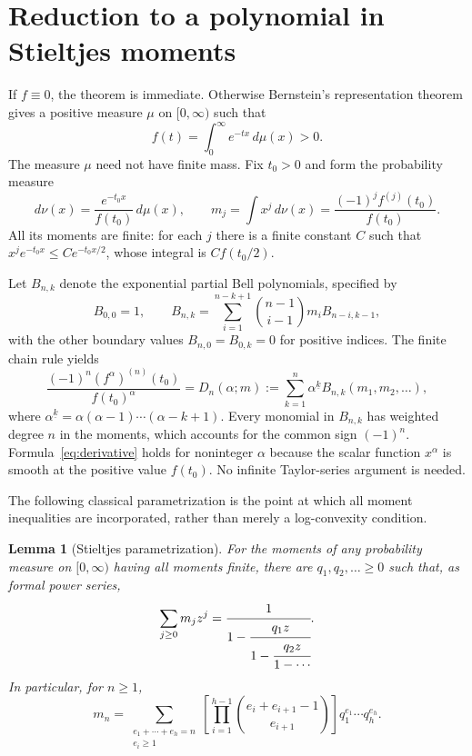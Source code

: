 \documentclass[11pt]{article}
\newtheorem{lemma}[theorem]{Lemma}
\newcommand{\fall}[2]{#1^{\underline{#2}}}
\begin{document}
\section{Reduction to a polynomial in Stieltjes moments}

If $f\equiv0$, the theorem is immediate. Otherwise Bernstein's representation
theorem \cite[Theorem~1.4]{Bernstein} gives a positive measure $\mu$ on $[0,\infty)$ such that
\[
f(t)=\int_0^\infty e^{-tx}\,d\mu(x)>0.
\]
The measure $\mu$ need not have finite mass. Fix $t_0>0$ and form the probability
measure
\[
d\nu(x)=\frac{e^{-t_0x}}{f(t_0)}\,d\mu(x),\qquad
m_j=\int x^j\,d\nu(x)=\frac{(-1)^jf^{(j)}(t_0)}{f(t_0)}.
\]
All its moments are finite: for each $j$ there is a finite constant $C$ such
that $x^je^{-t_0x}\le C e^{-t_0x/2}$, whose integral is $Cf(t_0/2)$.

Let $B_{n,k}$ denote the exponential partial Bell polynomials, specified by
\begin{equation}\label{eq:Bell}
B_{0,0}=1,\qquad
B_{n,k}=\sum_{i=1}^{n-k+1}\binom{n-1}{i-1}m_iB_{n-i,k-1},
\end{equation}
with the other boundary values $B_{n,0}=B_{0,k}=0$ for positive indices.
The finite chain rule yields
\begin{equation}\label{eq:derivative}
\frac{(-1)^n(f^\alpha)^{(n)}(t_0)}{f(t_0)^\alpha}
=D_n(\alpha;m):=\sum_{k=1}^n\fall{\alpha}{k}B_{n,k}(m_1,m_2,\ldots),
\end{equation}
where $\fall{\alpha}{k}=\alpha(\alpha-1)\cdots(\alpha-k+1)$.
Every monomial in $B_{n,k}$ has weighted degree $n$ in the moments, which
accounts for the common sign $(-1)^n$. Formula~\eqref{eq:derivative} holds for
noninteger $\alpha$ because the scalar function $x^\alpha$ is smooth at the
positive value $f(t_0)$. No infinite Taylor-series argument is needed.

The following classical parametrization is the point at which all moment
inequalities are incorporated, rather than merely a log-convexity condition.

\begin{lemma}[Stieltjes parametrization]\label{lem:Stieltjes}
For the moments of any probability measure on $[0,\infty)$ having all moments
finite, there are $q_1,q_2,\ldots\ge0$ such that, as formal power series,
\[
\sum_{j\ge0}m_jz^j=
\cfrac{1}{1-\cfrac{q_1z}{1-\cfrac{q_2z}{1-\cdots}}}.
\]
In particular, for $n\ge1$,
\begin{equation}\label{eq:compositions}
m_n=\sum_{\substack{e_1+\cdots+e_h=n\\e_i\ge1}}
\left[\prod_{i=1}^{h-1}\binom{e_i+e_{i+1}-1}{e_{i+1}}\right]
q_1^{e_1}\cdots q_h^{e_h}.
\end{equation}
\end{lemma}
\end{document}

